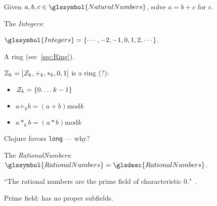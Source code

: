 \label{sec:Integers}

Given $a,b,c \in \glssymbol{NaturalNumbers}$,
solve $a = b + c$ for $c$.

The \textit{\gls{Integers}}: 

$\glssymbol{Integers} = \{\cdots, -2, -1, 0, 1, 2, \cdots\}$.

A ring (sec~\ref{sec:Ring}).

\label{sec:Cyclic-integers}

$\mathbb{Z}_{k} = \left[ \mathcal{Z}_{k}, +_k, *_k, 0, 1 \right]$
is a ring (?):
\begin{itemize}
  \item $\mathcal{Z}_{k} = \left\{ 0. \ldots k-1  \right\}$
  \item $ a +_k b = \left( a + b \right) \text{mod} k$
  \item $ a *_k b = \left( a * b \right) \text{mod} k$
\end{itemize}

\label{sec:int}

Clojure favors \texttt{long} --- why?

\label{sec:BigInteger}

\label{sec:Rational-numbers}

The \textit{\gls{RationalNumbers}}: 
$\glssymbol{RationalNumbers} = \glsdesc{RationalNumbers}$.

\label{sec:Axiomatic_definition_of_Q}

``The rational numbers are the prime field of characteristic 
0."~\cite{quora:Rational_axioms}.

Prime field: has no proper subfields.

